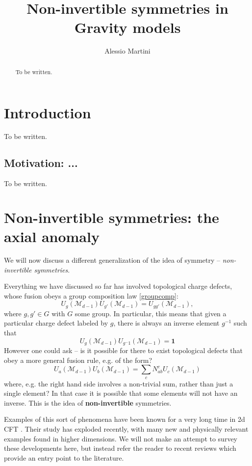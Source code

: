 \documentclass[aps,preprint,nofootinbib,preprintnumbers,eqsecnum,superscriptaddress]{revtex4}
\newcommand{\be}{\begin{equation}}
\newcommand{\ee}{\end{equation}}
\newcommand\sM{{\ensuremath{{\mathcal M}}}}
\numberwithin{equation}{section}
\begin{document}
\title{Non-invertible symmetries in Gravity models}
\author{Alessio Martini} 
\begin{abstract}
To be written.
\end{abstract} 
\maketitle


\tableofcontents

\newpage

\section{Introduction}

To be written. 

\subsection{Motivation: ...} \label{sec:motivation} 

To be written.
 
\section{Non-invertible symmetries: the axial anomaly}
We will now discuss a different generalization of the idea of symmetry -- {\it non-invertible symmetries}.

 Everything we have discussed so far has involved topological charge defects, whose fusion obeys a group composition law \eqref{groupcomp}:
\be
U_{g}(\sM_{d-1}) U_{g'}(\sM_{d-1}) = U_{g g'}(\sM_{d-1}),
\ee
where $g, g' \in G$ with $G$ some group. In particular, this means that given a particular charge defect labeled by $g$, there is always an inverse element $g^{-1}$ such that
\be
U_{g}(\sM_{d-1}) U_{g^-1}(\sM_{d-1}) = \mathbf{1}
\ee
However one could ask -- is it possible for there to exist topological defects that obey a more general fusion rule, e.g. of the form?
\be
U_{a}(\sM_{d-1}) U_{b}(\sM_{d-1}) = \sum_{c} N^{c}_{ab} U_{c}(\sM_{d-1})
\ee
where, e.g. the right hand side involves a non-trivial sum, rather than just a single element? In that case it is possible that some elements will not have an inverse. This is the idea of {\bf non-invertible} symmetries. 

Examples of this sort of phenomena have been known for a very long time in 2d CFT \cite{verlinde1988fusion}. Their study has exploded recently, with many new and physically relevant examples found in higher dimensions. We will not make an attempt to survey these developments here, but instead refer the reader to recent reviews \cite{Cordova:2022ruw,Schafer-Nameki:2023jdn,Shao:2023gho} which provide an entry point to the literature. 
\end{document}
